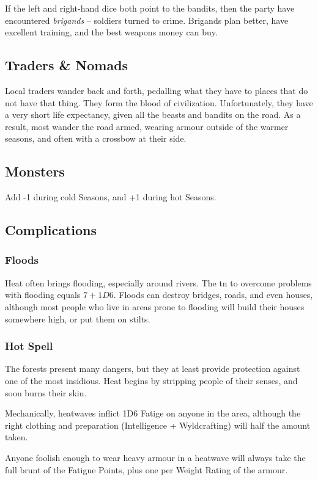 \begin{multicols}{2}
If the left and right-hand dice both point to the bandits, then the party have encountered \emph{brigands} -- soldiers turned to crime.
Brigands plan better, have excellent training, and the best weapons money can buy.

\subsection{Traders \& Nomads}

Local traders wander back and forth, pedalling what they have to places that do not have that thing.
They form the blood of civilization.
Unfortunately, they have a very short life expectancy, given all the beasts and bandits on the road.
As a result, most wander the road armed, wearing armour outside of the warmer seasons, and often with a crossbow at their side.

\subsection{Monsters}

Add -1 during cold Seasons, and +1 during hot Seasons.

\begin{enumerate}
  \setcounter{enumi}{-1}
\end{enumerate}

\subsection{Complications}

\subsubsection{Floods}

Heat often brings flooding, especially around rivers.
The \gls{tn} to overcome problems with flooding equals $7 + 1D6$.
Floods can destroy bridges, roads, and even houses, although most people who live in areas prone to flooding will build their houses somewhere high, or put them on stilts.

\subsubsection{Hot Spell}

The forests present many dangers, but they at least provide protection against one of the most insidious.
Heat begins by stripping people of their senses, and soon burns their skin.

Mechanically, heatwaves inflict 1D6 Fatige on anyone in the area, although the right clothing and preparation (Intelligence + Wyldcrafting) will half the amount taken.

Anyone foolish enough to wear heavy armour in a heatwave will always take the full brunt of the Fatigue Points, plus one per Weight Rating of the armour.


\end{multicols}
